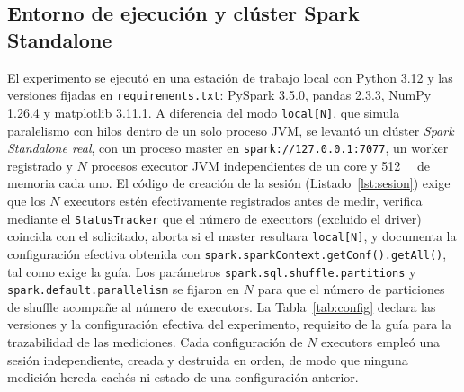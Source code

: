 \documentclass[10pt,journal]{IEEEtran}
\begin{document}
\subsection{Entorno de ejecuci\'on y cl\'uster Spark Standalone}
\label{sec:entorno}
El experimento se ejecut\'o en una estaci\'on de trabajo local con Python 3.12 y
las versiones fijadas en \texttt{requirements.txt}: PySpark 3.5.0, pandas 2.3.3,
NumPy 1.26.4 y matplotlib 3.11.1. A diferencia del modo \texttt{local[N]}, que
simula paralelismo con hilos dentro de un solo proceso JVM, se levant\'o un
cl\'uster \emph{Spark Standalone real}, con un proceso master en
\texttt{spark://127.0.0.1:7077}, un worker registrado y $N$ procesos executor
JVM independientes de un core y \SI{512}{\mebi\byte} de memoria cada uno. El
c\'odigo de creaci\'on de la sesi\'on (Listado~\ref{lst:sesion}) exige que los
$N$ executors est\'en efectivamente registrados antes de medir, verifica
mediante el \texttt{StatusTracker} que el n\'umero de executors (excluido el
driver) coincida con el solicitado, aborta si el master resultara
\texttt{local[N]}, y documenta la configuraci\'on efectiva obtenida con
\texttt{spark.sparkContext.getConf().getAll()}, tal como exige la gu\'ia. Los
par\'ametros \texttt{spark.sql.shuffle.partitions} y
\texttt{spark.default.parallelism} se fijaron en $N$ para que el n\'umero de
particiones de shuffle acompa\~ne al n\'umero de executors. La
Tabla~\ref{tab:config} declara las versiones y la configuraci\'on efectiva del
experimento, requisito de la gu\'ia para la trazabilidad de las mediciones.
Cada configuraci\'on de $N$ executors emple\'o una sesi\'on independiente,
creada y destruida en orden, de modo que ninguna medici\'on hereda cach\'es ni
estado de una configuraci\'on anterior.
\end{document}

